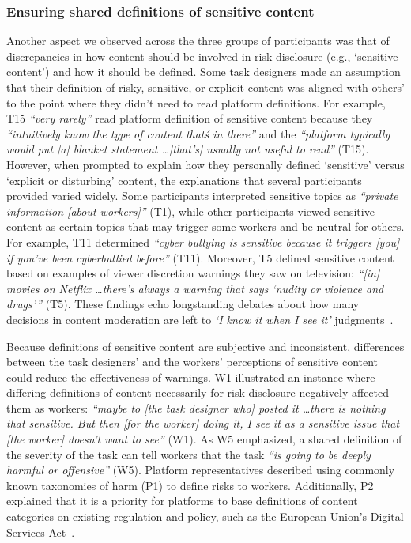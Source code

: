 \subsubsection{Ensuring shared definitions of sensitive
content}
Another aspect we observed across the three groups of participants was that of discrepancies in how content should be involved in risk disclosure (e.g., `sensitive content') and how it should be defined.
Some task designers made an assumption that their definition of risky, sensitive, or explicit content was aligned with others' to the point where they didn't need to read platform definitions. For example, T15 \textit{``very rarely''} read platform definition of sensitive content because they \textit{``intuitively know the type of content that\'s in there''} and the \textit{``platform typically would put [a] blanket statement \dots [that's] usually not useful to read''} (T15). However, when prompted to explain how they personally defined `sensitive' versus `explicit or disturbing' content, the explanations that several participants provided varied widely. Some participants interpreted sensitive topics as \textit{``private information [about workers]''} (T1), while other participants viewed sensitive content as certain topics that may trigger some workers and be neutral for others. For example, T11 determined \textit{``cyber bullying is sensitive because it triggers [you] if you've been cyberbullied before''} (T11). Moreover, T5 defined sensitive content based on examples of viewer discretion warnings they saw on television: \textit{``[in] movies on Netflix \dots there's always a warning that says `nudity or violence and drugs'''} (T5). These findings echo longstanding debates about how many decisions in content moderation are left to \textit{`I know it when I see it'} judgments~\cite{gillespie2020expanding, ohioknow}.

Because definitions of sensitive content are subjective and inconsistent, differences between the task designers' and the workers' perceptions of sensitive content could reduce the effectiveness of warnings. 
W1 illustrated an instance where differing definitions of content necessarily for risk disclosure negatively affected them as workers: \textit{``maybe to [the task designer who] posted it \dots there is nothing that sensitive. But then [for the worker] doing it, I see it as a sensitive issue that [the worker] doesn't want to see''} (W1). As W5 emphasized, a shared definition of the severity of the task can tell workers that the task \textit{``is going to be deeply harmful or offensive''} (W5). Platform representatives described using commonly known taxonomies of harm (P1) to define risks to workers. Additionally, P2 explained that it is a priority for platforms to base definitions of content categories on existing regulation and policy, such as the European Union's Digital Services Act~\cite{EU-DSA-2022}.


